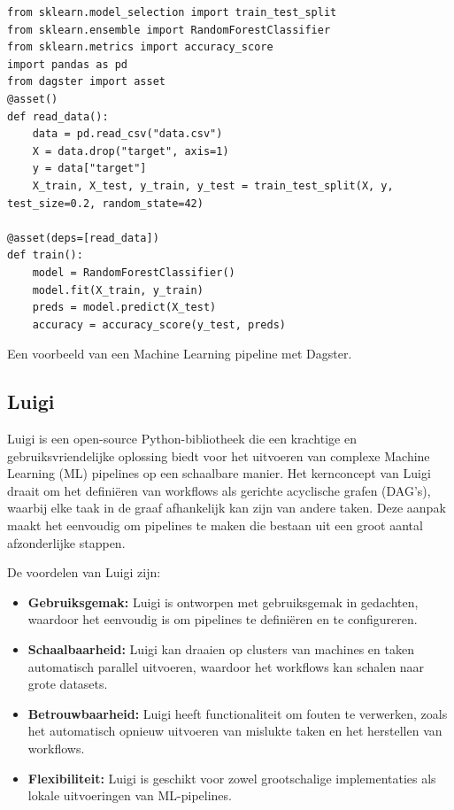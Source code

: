 \begin{listing}
\begin{verbatim}
from sklearn.model_selection import train_test_split
from sklearn.ensemble import RandomForestClassifier
from sklearn.metrics import accuracy_score
import pandas as pd
from dagster import asset
@asset()
def read_data():
    data = pd.read_csv("data.csv")
    X = data.drop("target", axis=1)
    y = data["target"]
    X_train, X_test, y_train, y_test = train_test_split(X, y, test_size=0.2, random_state=42)

@asset(deps=[read_data])  
def train():
    model = RandomForestClassifier()
    model.fit(X_train, y_train)
    preds = model.predict(X_test)
    accuracy = accuracy_score(y_test, preds)
\end{verbatim}
\caption[Voorbeeld van een Machine Learning pipeline met Dagster.]{\label{code:example-Dagster}Een voorbeeld van een Machine Learning pipeline met Dagster.}
\end{listing}

\subsection{Luigi}

Luigi is een open-source Python-bibliotheek die een krachtige en gebruiksvriendelijke oplossing biedt voor het uitvoeren van complexe Machine Learning (ML) pipelines op een schaalbare manier. Het kernconcept van Luigi draait om het definiëren van workflows als gerichte acyclische grafen (DAG's), waarbij elke taak in de graaf afhankelijk kan zijn van andere taken. Deze aanpak maakt het eenvoudig om pipelines te maken die bestaan uit een groot aantal afzonderlijke stappen.

De voordelen van Luigi zijn:
\begin{itemize}
  \item \textbf{Gebruiksgemak:} Luigi is ontworpen met gebruiksgemak in gedachten, waardoor het eenvoudig is om pipelines te definiëren en te configureren.
  \item \textbf{Schaalbaarheid:} Luigi kan draaien op clusters van machines en taken automatisch parallel uitvoeren, waardoor het workflows kan schalen naar grote datasets.
  \item \textbf{Betrouwbaarheid:} Luigi heeft functionaliteit om fouten te verwerken, zoals het automatisch opnieuw uitvoeren van mislukte taken en het herstellen van workflows.
  \item \textbf{Flexibiliteit:} Luigi is geschikt voor zowel grootschalige implementaties als lokale uitvoeringen van ML-pipelines.
\end{itemize}

